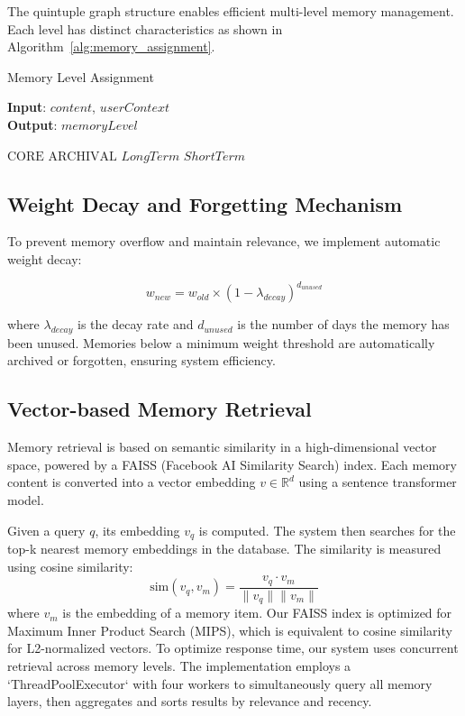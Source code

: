 \documentclass[letterpaper]{article} %
\begin{document}
The quintuple graph structure enables efficient multi-level memory management. Each level has distinct characteristics as shown in Algorithm~\ref{alg:memory_assignment}.

\begin{algorithm}[tb]
\caption{Memory Level Assignment}
\label{alg:memory_assignment}
\textbf{Input}: $\mathit{content}$, $\mathit{userContext}$\\
\textbf{Output}: $\mathit{memoryLevel}$
\begin{algorithmic}[1]
    \State \Return $\text{CORE}$
    \State \Return $\text{ARCHIVAL}$
    \State \Return $\mathit{LongTerm}$
\Else
    \State \Return $\mathit{ShortTerm}$
\EndIf
\end{algorithmic}
\end{algorithm}

\subsection{Weight Decay and Forgetting Mechanism}

To prevent memory overflow and maintain relevance, we implement automatic weight decay:

\begin{equation}
w_{new} = w_{old} \times (1 - \lambda_{decay})^{d_{unused}}
\end{equation}

where $\lambda_{decay}$ is the decay rate and $d_{unused}$ is the number of days the memory has been unused. Memories below a minimum weight threshold are automatically archived or forgotten, ensuring system efficiency.

\subsection{Vector-based Memory Retrieval}

Memory retrieval is based on semantic similarity in a high-dimensional vector space, powered by a FAISS (Facebook AI Similarity Search) index. Each memory content is converted into a vector embedding $v \in \mathbb{R}^d$ using a sentence transformer model.

Given a query $q$, its embedding $v_q$ is computed. The system then searches for the top-k nearest memory embeddings in the database. The similarity is measured using cosine similarity:
\begin{equation}
\text{sim}(v_q, v_m) = \frac{v_q \cdot v_m}{\|v_q\| \|v_m\|}
\end{equation}
where $v_m$ is the embedding of a memory item. Our FAISS index is optimized for Maximum Inner Product Search (MIPS), which is equivalent to cosine similarity for L2-normalized vectors. To optimize response time, our system uses concurrent retrieval across memory levels. The implementation employs a `ThreadPoolExecutor` with four workers to simultaneously query all memory layers, then aggregates and sorts results by relevance and recency.
\end{document}
